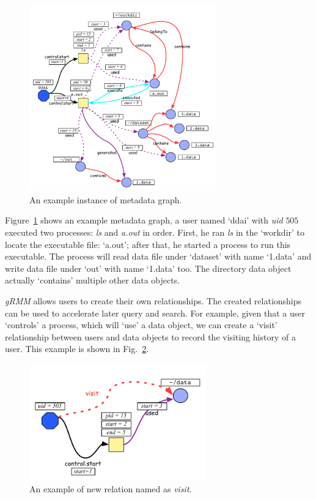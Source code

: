 \begin{figure}[ht]
 \begin{center}
   \includegraphics[width=3.2in]{images/exagraph.pdf}
   \caption{An example instance of metadata graph.}
   \label{exampleGraph}
 \end{center}
\end{figure}

Figure~\ref{exampleGraph} shows an example metadata graph, a user
named `ddai' with \textit{uid} $505$ executed two processes: \textit{ls} and
\textit{a.out} in order. First, he ran \textit{ls} in the `workdir' to
locate the executable file: `a.out'; after that, he started a process to
run this executable. The process will read data file under `dataset' with
name `1.data' and write data file under `out' with name `1.data' too. The
directory data object actually `contains' multiple other data objects.




\textit{gRMM} allows users to create their own relationships. The created relationships can be used to accelerate later query and
search. For example, given that a user `controls' a process, which will `use'
a data object, we can create a `visit' relationship between users and
data objects to record the visiting history of a user. This example is shown
in Fig.~\ref{nr}.

\begin{figure}[ht]
\begin{center}
\includegraphics[width=3in]{images/newrelation.pdf}
\caption{An example of new relation named as \textit{visit}.}                                                                                  
\label{nr}
\end{center}
\end{figure}

